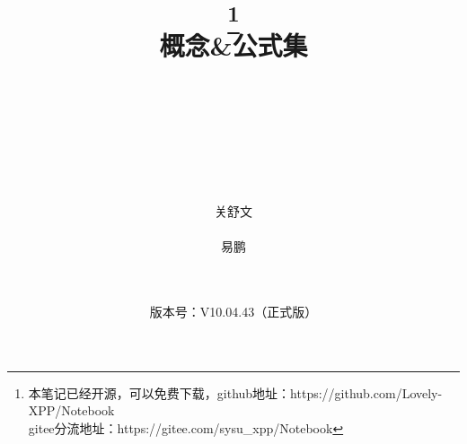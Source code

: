 \documentclass[10pt,a4paper]{book}
\title{\vspace*{-2em}{\Huge 大学物理上册}\thanks{本笔记已经开源，可以免费下载，github地址：https://github.com/Lovely-XPP/Notebook\\ \hspace*{5.24cm} gitee分流地址：https://gitee.com/sysu\_xpp/Notebook}\\[1em]
	概念\&公式集
\vspace{4cm}}
\author{
	\quad\\
	\quad\\
	\quad\\
	\quad\\
	\quad\\
	\quad\\
	\begin{minipage}{0.5\linewidth}
		\centering 
		\color{titlepurple}关舒文\\
		{\color{titlepurple} \CJKfamily{kai}{华南理工大学}}
	\end{minipage}
	\hfill
	\begin{minipage}{0.5\linewidth}
		\centering 
		\color{titlepurple}易鹏\\
		{\color{titlepurple} \CJKfamily{kai}{中山大学}}
	\end{minipage}
\quad \\[1em]}
\date{版本号：V10.04.43（正式版） \\[1em]\color{titlepurple}{2020年7月17日}}
\renewcommand{\textbf}[1]{{\CJKfamily{heiti}#1}}%
\begin{document}
\allowdisplaybreaks%
\renewcommand{\thefootnote}{*}
	\maketitle
\renewcommand{\thefootnote}{\arabic{footnote}}
\thispagestyle{empty}
\cleardoublepage
\thispagestyle{empty}
\restoregeometry
\setcounter{page}{1}
\tableofcontents
\cleardoublepage


\newcommand{\eq}[1][]{\colorbox{eq}{$\displaystyle #1$}}
\newcommand{\dy}[2][]{\vspace*{0.7em} \noindent \tcbox[colframe =Chocolate , colback =Coral,boxrule=0.5mm,size=small,on line]{\color{dya}{\textbf{#1}}}  \index{#2@#1} \hspace*{1em}}
\newcommand{\dya}[1][]{\vspace*{0.7em} \noindent \tcbox[colframe =Chocolate, colback =Coral,boxrule=0.5mm,size=small,on line]{\color{dya}{\textbf{#1}}} \hspace*{1em} }
\newcommand{\n}{\par}
\newcommand{\rd}{\rm{d}}
\newcommand{\disp}{\displaystyle}
\newcommand{\jg}{\vspace*{0.5em}}
\renewcommand{\d}{{\rm{d}}}
\newcommand{\kg}{\hspace*{18pt}}
\newcommand{\tkg}{\quad \quad }
\newcommand{\e}{{\rm{e}}}
























\pagestyle{headings}
\newpage
{}
\appendix
{}
\color{titlepurple}
\printindex
\end{document}
